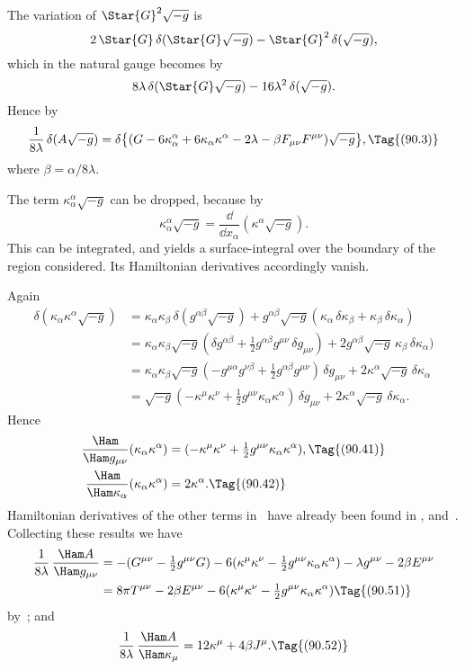 \documentclass[12pt]{book}
\begin{document}
The variation of $\Star{G}^{2} \sqrt{-g}$ is
\[
2\, \Star{G}\, \delta(\Star{G} \sqrt{-g}) - \Star{G}^{2}\, \delta(\sqrt{-g}),
\]
which in the natural gauge becomes by~
\[
8\lambda\, \delta(\Star{G} \sqrt{-g}) - 16\lambda^{2}\, \delta(\sqrt{-g}).
\]
Hence by~
\[
\frac{1}{8\lambda}\, \delta(A \sqrt{-g})
= \delta \bigl\{(G - 6\kappa_{\alpha}^{\alpha} + 6\kappa_{\alpha} \kappa^{\alpha} - 2\lambda - \beta F_{\mu\nu} F^{\mu\nu}) \sqrt{-g}\bigr\},
\Tag{(90.3)}
\]
where $\beta = \alpha/8\lambda$.

The term $\kappa_{\alpha}^{\alpha} \sqrt{-g}$ can be dropped, because by~
\[
\kappa_{\alpha}^{\alpha} \sqrt{-g}
= \frac{\dd}{\dd x_{\alpha}} (\kappa^{\alpha} \sqrt{-g}).
\]
This can be integrated, and yields a surface-integral over the boundary of the
region considered. Its Hamiltonian derivatives accordingly vanish.

Again
\begin{align*}
  \delta (\kappa_{\alpha} \kappa^{\alpha} \sqrt{-g})
  &= \kappa_{\alpha} \kappa_{\beta}\, \delta(g^{\alpha\beta} \sqrt{-g})
  + g^{\alpha\beta} \sqrt{-g} (\kappa_{\alpha}\, \delta\kappa_{\beta} + \kappa_{\beta}\, \delta\kappa_{\alpha}) \\
  &= \kappa_{\alpha} \kappa_{\beta} \sqrt{-g} (\delta g^{\alpha\beta} + \tfrac{1}{2} g^{\alpha\beta} g^{\mu\nu}\, \delta g_{\mu\nu})
  + 2g^{\alpha\beta} \sqrt{-g}\, \kappa_{\beta}\, \delta\kappa_{\alpha}) \\
  &= \kappa_{\alpha} \kappa_{\beta} \sqrt{-g} (-g^{\mu\alpha} g^{\nu\beta} + \tfrac{1}{2} g^{\alpha\beta} g^{\mu\nu})\, \delta g_{\mu\nu}
  + 2\kappa^{\alpha} \sqrt{-g}\, \delta\kappa_{\alpha} \\
  &= \sqrt{-g} (-\kappa^{\mu} \kappa^{\nu} + \tfrac{1}{2} g^{\mu\nu} \kappa_{\alpha} \kappa^{\alpha})\, \delta g_{\mu\nu}
  + 2\kappa^{\alpha} \sqrt{-g}\, \delta\kappa_{\alpha}.
\end{align*}
Hence
\begin{align*}
  \frac{\Ham}{\Ham g_{\mu\nu}} (\kappa_{\alpha} \kappa^{\alpha})
  &= (-\kappa^{\mu} \kappa^{\nu} + \tfrac{1}{2} g^{\mu\nu} \kappa_{\alpha} \kappa^{\alpha}),
  \Tag{(90.41)} \\
  \frac{\Ham}{\Ham \kappa_{\alpha}} (\kappa_{\alpha} \kappa^{\alpha})
  &= 2\kappa^{\alpha}.
  \Tag{(90.42)}
\end{align*}
Hamiltonian derivatives of the other terms in~ have already been found
in ,  and~. Collecting these results we have
\begin{align*}
  \frac{1}{8\lambda}\, \frac{\Ham A}{\Ham g_{\mu\nu}}
  &= -(G^{\mu\nu} - \tfrac{1}{2} g^{\mu\nu} G)
  - 6(\kappa^{\mu} \kappa^{\nu} - \tfrac{1}{2} g^{\mu\nu} \kappa_{\alpha} \kappa^{\alpha})
  - \lambda g^{\mu\nu} - 2\beta E^{\mu\nu} \\
  &= 8\pi T^{\mu\nu} - 2\beta E^{\mu\nu} - 6(\kappa^{\mu} \kappa^{\nu} - \tfrac{1}{2} g^{\mu\nu} \kappa_{\alpha} \kappa^{\alpha})
  \Tag{(90.51)}
\end{align*}
by~; and
\[
\frac{1}{8\lambda}\, \frac{\Ham A}{\Ham \kappa_{\mu}}
= 12\kappa^{\mu} + 4\beta J^{\mu}.
\Tag{(90.52)}
\]
\end{document}
